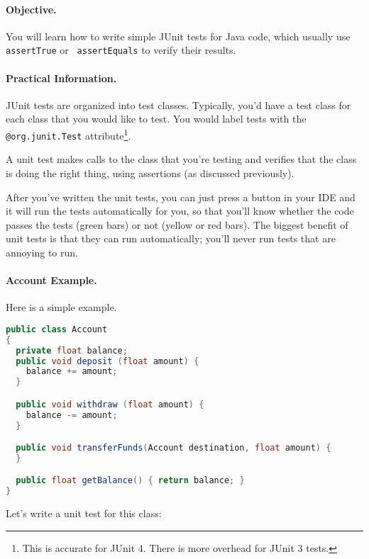 \paragraph{Objective.} You will learn how to write simple JUnit 
tests for Java code, which usually use {\tt assertTrue} or {\tt
  assertEquals} to verify their results.

\paragraph{Practical Information.} JUnit tests are organized into 
test classes. Typically, you'd have a test class for each class that
you would like to test. You would label tests with the {\tt @org.junit.Test} attribute\footnote{This is
accurate for JUnit 4. There is more overhead for JUnit 3 tests.}.

A unit test makes calls to the class that you're testing and verifies
that the class is doing the right thing, using assertions (as
discussed previously).

After you've written the unit tests, you can just press a button in
your IDE and it will run the tests automatically for you, so that
you'll know whether the code passes the tests (green bars) or not
(yellow or red bars). The biggest benefit of unit tests is that they
can run automatically; you'll never run tests that are annoying to
run.

\paragraph{Account Example.} Here is a simple example.

\begin{lstlisting}[language={Java}]
public class Account
{
  private float balance;
  public void deposit (float amount) {
    balance += amount;
  }

  public void withdraw (float amount) {
    balance -= amount;
  }

  public void transferFunds(Account destination, float amount) {
  }

  public float getBalance() { return balance; }
}
\end{lstlisting}

Let's write a unit test for this class:

